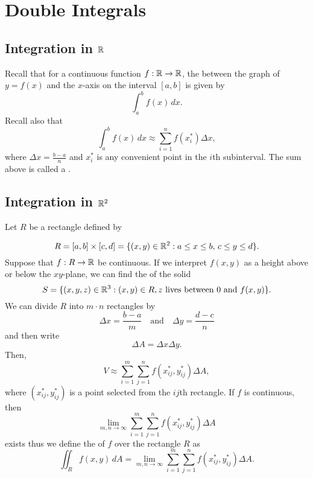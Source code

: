 \section{Double Integrals}

\subsection{Integration in \(\mathbb{R}\)}

Recall that for a continuous function \(f : \mathbb{R} \to \mathbb{R}\), the  between the graph of \(y = f(x)\) and the
\(x\)-axis on the interval \([a, b]\) is given by
\[
  \int_a^b f(x) \, dx.
\]
Recall also that
\[
  \int_a^b f(x) \, dx \approx \sum_{i=1}^n f(x^*_i) \Delta x,
\]
where \(\Delta x = \frac{b-a}{n}\) and \(x^*_i\) is any convenient point in the \(i\)th subinterval. The sum above is called a .

\subsection{Integration in \(\mathbb{R}^2\)}

Let \(R\) be a rectangle defined by

\[
  R = [a, b] \times [c, d] = \{(x, y) \in \mathbb{R}^2 : a \leq x \leq b, \, c \leq y \leq d\}.
\]
Suppose that \(f : R \to \mathbb{R}\) be continuous. If we interpret \(f(x, y)\) as a height above or below the \(xy\)-plane, we can find the  of the solid
\[
  S = \{(x, y, z) \in \mathbb{R}^3 : (x, y) \in R, z \text{ lives between } 0 \text{ and } f(x, y)\}.
\]
We can divide \(R\) into \(m \cdot n\) rectangles by
\[
  \Delta x = \frac{b-a}{m} \quad \text{and} \quad \Delta y = \frac{d-c}{n}
\]
and then write
\[
  \Delta A = \Delta x \Delta y.
\]
Then,
\[
  V \approx \sum_{i=1}^m \sum_{j=1}^n f(x^*_{ij}, y^*_{ij}) \Delta A,
\]
where \((x^*_{ij}, y^*_{ij})\) is a point selected from the \(ij\)th rectangle.
\newpage
If \(f\) is continuous, then
\[
  \lim_{m,n \to \infty} \sum_{i=1}^m \sum_{j=1}^n f(x^*_{ij}, y^*_{ij}) \Delta A
\]
exists thus we define the  of \(f\) over the rectangle \(R\) as
\[
  \iint_R f(x, y) \, dA = \lim_{m,n \to \infty} \sum_{i=1}^m \sum_{j=1}^n f(x^*_{ij}, y^*_{ij}) \Delta A.
\]
